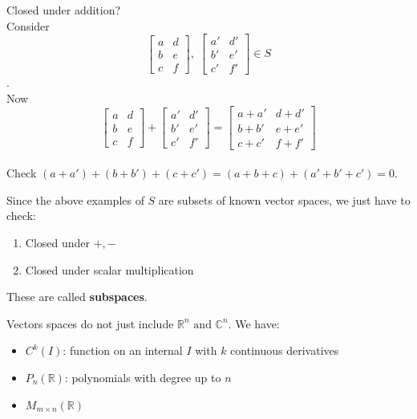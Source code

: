 \documentclass[../main.tex]{subfiles}
\begin{document}
\begin{example}
    Closed under addition? \checkmark \\
    Consider \[ \begin{bmatrix} a & d \\ b & e \\ c & f \end{bmatrix}, \; \begin{bmatrix} a' & d' \\ b' & e' \\ c' & f' \end{bmatrix} \in S\]. \\
    Now \[ \begin{bmatrix} a & d \\ b & e \\ c & f \end{bmatrix} + \begin{bmatrix} a' & d' \\ b' & e' \\ c' & f' \end{bmatrix} =
    \begin{bmatrix} a+a' & d+d' \\ b+b' & e+e' \\ c+c' & f+f' \end{bmatrix} \] \\
    Check \( (a+a') + (b+b') + (c+c') = (a+b+c) + (a'+b'+c') = 0 \).
\end{example}

\begin{note}
    Since the above examples of \( S \) are subsets of known vector spaces, we just have to check:
    \begin{enumerate}
        \item Closed under \( +,- \)
        \item Closed under scalar multiplication
    \end{enumerate}

    These are called \textbf{subspaces}.
\end{note}

Vectors spaces do not just include \( \mathbb{R}^n \text{ and } \mathbb{C}^n \).
We have:
\begin{itemize}
    \item \( C^k(I) \): function on an internal \( I \) with \( k \) continuous derivatives
    \item \( P_n(\mathbb{R}) \): polynomials with degree up to \( n \)
    \item \( M_{m \times n}(\mathbb{R}) \)
\end{itemize}
\end{document}
